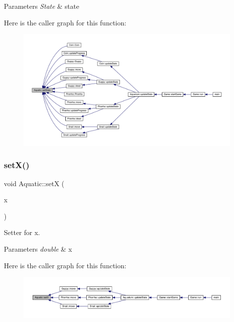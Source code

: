 \begin{DoxyParams}{Parameters}
{\em State} & state \\
\hline
\end{DoxyParams}
Here is the caller graph for this function\+:\nopagebreak
\begin{figure}[H]
\begin{center}
\leavevmode
\includegraphics[width=350pt]{class_aquatic_a33de0f838d9a6f504cd8efeaa112b4ea_icgraph}
\end{center}
\end{figure}
\mbox{\label{class_aquatic_a4f5f9426805afd153c659cd0bb535ef6}} 
\subsubsection{\texorpdfstring{set\+X()}{setX()}}
{\footnotesize\ttfamily void Aquatic\+::setX (\begin{DoxyParamCaption}\item[{double}]{x }\end{DoxyParamCaption})}



Setter for x. 


\begin{DoxyParams}{Parameters}
{\em double} & x \\
\hline
\end{DoxyParams}
Here is the caller graph for this function\+:\nopagebreak
\begin{figure}[H]
\begin{center}
\leavevmode
\includegraphics[width=350pt]{class_aquatic_a4f5f9426805afd153c659cd0bb535ef6_icgraph}
\end{center}
\end{figure}
\mbox{\label{class_aquatic_af767ef441e7112a700975f6709b85dc9}} 
